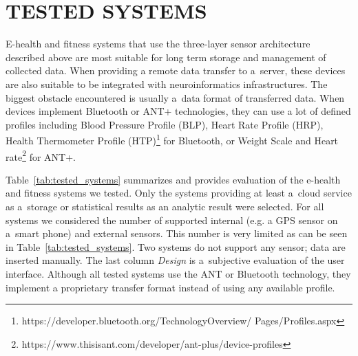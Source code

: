 \documentclass[a4paper,twoside]{article}
\begin{document}
\section{\uppercase{Tested systems}}
\label{tested_systems}
\noindent

E-health and fitness systems that use the three-layer sensor architecture described above are most suitable for long term storage and management of collected data. When providing a remote data transfer to a~server, these devices are also suitable to be integrated with neuroinformatics infrastructures. The biggest obstacle encountered is usually a~data format of transferred data. When devices implement Bluetooth or ANT+ technologies, they can use a lot of defined profiles including Blood Pressure Profile (BLP), Heart Rate Profile (HRP), Health Thermometer Profile (HTP)\footnote{https://developer.bluetooth.org/TechnologyOverview/ Pages/Profiles.aspx} for Bluetooth, or Weight Scale and Heart rate\footnote{https://www.thisisant.com/developer/ant-plus/device-profiles} for ANT+.

Table~\ref{tab:tested_systems} summarizes and provides evaluation of the e-health and fitness systems we tested. Only the systems providing at least a~cloud service as a~storage or statistical results as an analytic result were selected. For all systems we considered the number of supported internal (e.g. a GPS sensor on a~smart phone) and external sensors. This number is very limited as can be seen in Table~\ref{tab:tested_systems}. Two systems do not support any sensor; data are inserted manually. The last column \emph{Design} is a~subjective evaluation of the user interface. Although all tested systems use the ANT or Bluetooth technology, they implement a proprietary transfer format instead of using any available profile.
\end{document}
